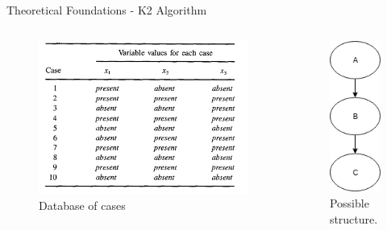 \begin{frame}{Theoretical Foundations - K2 Algorithm}
        \begin{columns}
	    \centering
        \begin{figure}[!h]
            \centering
            \includegraphics[scale=0.4]{figuras/cases_cooper.png}
            \caption{Database of cases}
            \label{fig:casesCoop}
        \end{figure}
        \centering
        \begin{figure}[!h]
            \centering
            \includegraphics[scale=0.45]{figuras/typicOrder.png}
            \caption{Possible structure.}
            \label{fig:cases_graph}
        \end{figure}
	      
    \end{columns}
\end{frame}

